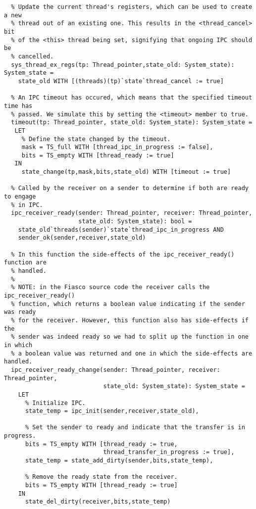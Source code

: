 \begin{lstlisting}
  % Update the current thread's registers, which can be used to create a new
  % thread out of an existing one. This results in the <thread_cancel> bit
  % of the <this> thread being set, signifying that ongoing IPC should be
  % cancelled.
  sys_thread_ex_regs(tp: Thread_pointer,state_old: System_state): System_state =
    state_old WITH [(threads)(tp)`state`thread_cancel := true]
    
  % An IPC timeout has occured, which means that the specified timeout time has
  % passed. We simulate this by setting the <timeout> member to true.
  timeout(tp: Thread_pointer, state_old: System_state): System_state =
   LET
     % Define the state changed by the timeout.
     mask = TS_full WITH [thread_ipc_in_progress := false],
     bits = TS_empty WITH [thread_ready := true]
   IN
     state_change(tp,mask,bits,state_old) WITH [timeout := true]

  % Called by the receiver on a sender to determine if both are ready to engage
  % in IPC.  
  ipc_receiver_ready(sender: Thread_pointer, receiver: Thread_pointer,
                     state_old: System_state): bool =
    state_old`threads(sender)`state`thread_ipc_in_progress AND 
    sender_ok(sender,receiver,state_old)

  % In this function the side-effects of the ipc_receiver_ready() function are
  % handled.
  %
  % NOTE: in the Fiasco source code the receiver calls the ipc_receiver_ready()
  % function, which returns a boolean value indicating if the sender was ready
  % for the receiver. However, this function also has side-effects if the 
  % sender was indeed ready so we had to split up the function in one in which
  % a boolean value was returned and one in which the side-effects are handled.
  ipc_receiver_ready_change(sender: Thread_pointer, receiver: Thread_pointer,
                            state_old: System_state): System_state =
    LET
      % Initialize IPC.
      state_temp = ipc_init(sender,receiver,state_old),

      % Set the sender to ready and indicate that the transfer is in progress.
      bits = TS_empty WITH [thread_ready := true,
                            thread_transfer_in_progress := true],
      state_temp = state_add_dirty(sender,bits,state_temp),

      % Remove the ready state from the receiver.
      bits = TS_empty WITH [thread_ready := true]
    IN
      state_del_dirty(receiver,bits,state_temp)
   

\end{lstlisting}
